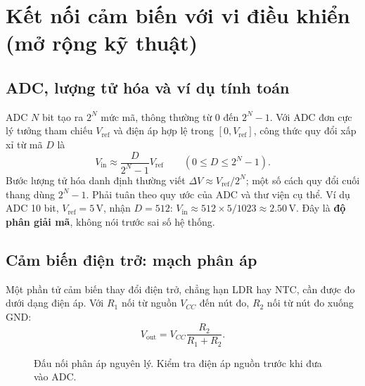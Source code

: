 \section{Kết nối cảm biến với vi điều khiển (mở rộng kỹ thuật)}
\subsection{ADC, lượng tử hóa và ví dụ tính toán}
ADC $N$ bit tạo ra $2^N$ mức mã, thông thường từ $0$ đến $2^N-1$. Với ADC đơn cực lý tưởng tham chiếu $V_{\mathrm{ref}}$ và điện áp hợp lệ trong $[0,V_{\mathrm{ref}}]$, công thức quy đổi xấp xỉ từ mã $D$ là
\begin{equation}\boxed{V_{\mathrm{in}}\approx\frac{D}{2^N-1}V_{\mathrm{ref}}}\qquad (0\le D\le 2^N-1).\end{equation}
Bước lượng tử hóa danh định thường viết $\Delta V\approx V_{\mathrm{ref}}/2^N$; một số cách quy đổi cuối thang dùng $2^N-1$. Phải tuân theo quy ước của ADC và thư viện cụ thể. Ví dụ ADC 10 bit, $V_{\mathrm{ref}}=5\,\mathrm{V}$, nhận $D=512$: $V_{\mathrm{in}}\approx512\times5/1023\approx2.50\,\mathrm{V}$. Đây là \textbf{độ phân giải mã}, không nói trước sai số hệ thống.

\subsection{Cảm biến điện trở: mạch phân áp}
Một phần tử cảm biến thay đổi điện trở, chẳng hạn LDR hay NTC, cần được đo dưới dạng điện áp. Với $R_1$ nối từ nguồn $V_{CC}$ đến nút đo, $R_2$ nối từ nút đo xuống GND:
\begin{equation}V_{\mathrm{out}}=V_{CC}\frac{R_2}{R_1+R_2}.\end{equation}
\begin{figure}[htbp]\centering
{}
\caption{Đấu nối phân áp nguyên lý. Kiểm tra điện áp nguồn trước khi đưa vào ADC.}
\end{figure}


